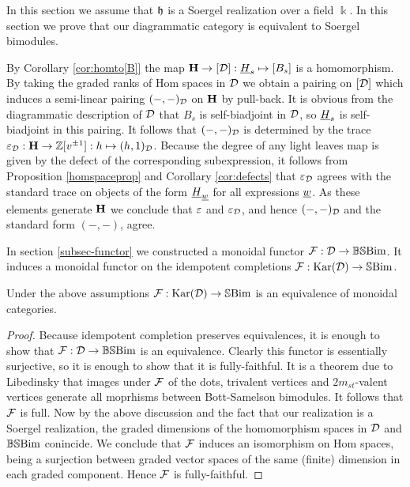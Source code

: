 In this section we assume that ${\mathfrak h}$ is a Soergel realization over a field $\Bbbk$. In this section we prove that our diagrammatic category is equivalent to Soergel bimodules.

By Corollary \ref{cor:homto[B]} the map ${\mathbf H} \rightarrow [{\mathcal{D}}] : \underline{H}_s \mapsto [B_s]$ is a homomorphism. By taking the graded ranks of Hom spaces in ${\mathcal{D}}$ we obtain a pairing on $[{\mathcal{D}}]$ which induces a semi-linear pairing $( - , - )_{{\mathcal{D}}}$ on ${\mathbf H}$ by pull-back. It is obvious from the diagrammatic description of ${\mathcal{D}}$ that $B_s$ is self-biadjoint in ${\mathcal{D}}$, so $\underline{H}_s$ is self-biadjoint in this pairing. It follows that $( -, - )_{{\mathcal{D}}}$ is determined by the trace $\varepsilon_{\mathcal{D}} : {\mathbf H} \rightarrow {\mathbb{Z}}[v^{\pm 1}] : h \mapsto ( h, 1 )_{{\mathcal{D}}}$. Because the degree of any light leaves map is given by the defect of the corresponding subexpression, it follows from Proposition \ref{homspaceprop} and Corollary \ref{cor:defects} that $\varepsilon_{{\mathcal{D}}}$ agrees with the standard trace on objects of the form $\underline{H}_{\underline{w}}$ for all expressions $\underline{w}$. As these elements generate ${\mathbf H}$ we conclude that $\varepsilon$ and $\varepsilon_{{\mathcal{D}}}$, and hence $( - , - )_{{\mathcal{D}}}$ and the standard form $( -, - )$, agree.

In section \ref{subsec-functor} we constructed a monoidal functor ${\mathcal{F}} : {\mathcal{D}} \rightarrow \mathbb{BS}\textrm{Bim}$. It induces a monoidal functor on the idempotent completions ${\mathcal{F}} : \textrm{Kar}({\mathcal{D}}) \rightarrow \mathbb{S}\textrm{Bim}$.

\begin{thm} Under the above assumptions ${\mathcal{F}} : \textrm{Kar}({\mathcal{D}}) \rightarrow \mathbb{S}\textrm{Bim}$ is an equivalence of monoidal categories. \label{thm-equiv}
\end{thm}

\begin{proof} Because idempotent completion preserves equivalences, it is enough to show that ${\mathcal{F}} : {\mathcal{D}} \rightarrow \mathbb{BS}\textrm{Bim}$ is an equivalence. Clearly this functor is essentially surjective, so it is enough to show that it is fully-faithful. It is a theorem due to Libedinsky \cite{Lib} that images under ${\mathcal{F}}$ of the dots, trivalent vertices and $2m_{st}$-valent vertices generate all moprhisms between Bott-Samelson bimodules. It follows that ${\mathcal{F}}$ is full. Now by the above discussion and the fact that our realization is a Soergel realization, the graded dimensions of the homomorphism spaces in ${\mathcal{D}}$ and $\mathbb{BS}\textrm{Bim}$ conincide. We conclude that ${\mathcal{F}}$ induces an isomorphism on Hom spaces, being a surjection between graded vector spaces of the same (finite) dimension in each graded component. Hence ${\mathcal{F}}$ is fully-faithful.\end{proof}

